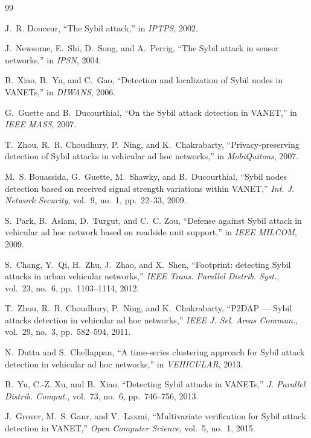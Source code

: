 \begin{thebibliography}{99}

 J.~R. Douceur, ``The Sybil attack,'' in \emph{IPTPS}, 2002.

 J.~Newsome, E.~Shi, D.~Song, and A.~Perrig, ``The Sybil attack in sensor networks,'' in \emph{IPSN}, 2004.

 B.~Xiao, B.~Yu, and C.~Gao, ``Detection and localization of Sybil nodes in VANETs,'' in \emph{DIWANS}, 2006.

 G.~Guette and B.~Ducourthial, ``On the Sybil attack detection in VANET,'' in \emph{IEEE MASS}, 2007.

 T.~Zhou, R.~R. Choudhury, P.~Ning, and K.~Chakrabarty, ``Privacy-preserving detection of Sybil attacks in vehicular ad hoc networks,'' in \emph{MobiQuitous}, 2007.

 M.~S. Bouassida, G.~Guette, M.~Shawky, and B.~Ducourthial, ``Sybil nodes detection based on received signal strength variations within VANET,'' \emph{Int. J. Network Security}, vol.~9, no.~1, pp.~22--33, 2009.

 S.~Park, B.~Aslam, D.~Turgut, and C.~C. Zou, ``Defense against Sybil attack in vehicular ad hoc network based on roadside unit support,'' in \emph{IEEE MILCOM}, 2009.

 S.~Chang, Y.~Qi, H.~Zhu, J.~Zhao, and X.~Shen, ``Footprint: detecting Sybil attacks in urban vehicular networks,'' \emph{IEEE Trans. Parallel Distrib. Syst.}, vol.~23, no.~6, pp.~1103--1114, 2012.

 T.~Zhou, R.~R. Choudhury, P.~Ning, and K.~Chakrabarty, ``P2DAP --- Sybil attacks detection in vehicular ad hoc networks,'' \emph{IEEE J. Sel. Areas Commun.}, vol.~29, no.~3, pp.~582--594, 2011.

 N.~Dutta and S.~Chellappan, ``A time-series clustering approach for Sybil attack detection in vehicular ad hoc networks,'' in \emph{VEHICULAR}, 2013.

 B.~Yu, C.-Z. Xu, and B.~Xiao, ``Detecting Sybil attacks in VANETs,'' \emph{J. Parallel Distrib. Comput.}, vol.~73, no.~6, pp.~746--756, 2013.

 J.~Grover, M.~S. Gaur, and V.~Laxmi, ``Multivariate verification for Sybil attack detection in VANET,'' \emph{Open Computer Science}, vol.~5, no.~1, 2015.


\end{thebibliography}
